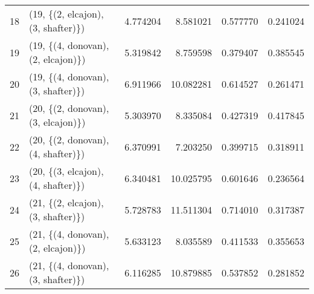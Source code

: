 \begin{tabular}{llrrrr}
18 &  (19, \{(2, elcajon), (3, shafter)\}) &   4.774204 &   8.581021 &   0.577770 &  0.241024 \\
19 &  (19, \{(4, donovan), (2, elcajon)\}) &   5.319842 &   8.759598 &   0.379407 &  0.385545 \\
20 &  (19, \{(4, donovan), (3, shafter)\}) &   6.911966 &  10.082281 &   0.614527 &  0.261471 \\
21 &  (20, \{(2, donovan), (3, elcajon)\}) &   5.303970 &   8.335084 &   0.427319 &  0.417845 \\
22 &  (20, \{(2, donovan), (4, shafter)\}) &   6.370991 &   7.203250 &   0.399715 &  0.318911 \\
23 &  (20, \{(3, elcajon), (4, shafter)\}) &   6.340481 &  10.025795 &   0.601646 &  0.236564 \\
24 &  (21, \{(2, elcajon), (3, shafter)\}) &   5.728783 &  11.511304 &   0.714010 &  0.317387 \\
25 &  (21, \{(4, donovan), (2, elcajon)\}) &   5.633123 &   8.035589 &   0.411533 &  0.355653 \\
26 &  (21, \{(4, donovan), (3, shafter)\}) &   6.116285 &  10.879885 &   0.537852 &  0.281852 \\
\bottomrule
\end{tabular}

